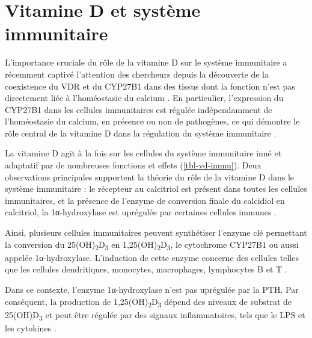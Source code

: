 \documentclass[
  a4paper,
  DIV=11,
  numbers=noendperiod,
  listof=totoc]{scrreprt}
\begin{document}
\newpage{}

\hypertarget{vitamine-d-et-systuxe8me-immunitaire}{%
\chapter{Vitamine D et système
immunitaire}\label{vitamine-d-et-systuxe8me-immunitaire}}

L'importance cruciale du rôle de la vitamine D sur le système
immunitaire a récemment captivé l'attention des chercheurs depuis la
découverte de la coexistence du \ac{VDR} et du \ac{CYP27B1} dans des
tissus dont la fonction n'est pas directement liée à l'homéostasie du
calcium \autocite{Zehnder.2001}. En particulier, l'expression du
\ac{CYP27B1} dans les cellules immunitaires est régulée indépendamment
de l'homéostasie du calcium, en présence ou non de pathogènes, ce qui
démontre le rôle central de la vitamine D dans la régulation du système
immunitaire \autocite{White.2022}.

La vitamine D agit à la fois sur les cellules du système immunitaire
inné et adaptatif par de nombreuses fonctions et effets
(\cref{tbl-vd-immu}). Deux observations principales supportent la
théorie du rôle de la vitamine D dans le système immunitaire : le
récepteur au calcitriol est présent dans toutes les cellules
immunitaires, et la présence de l'enzyme de conversion finale du
calcidiol en calcitriol, la 1α-hydroxylase est uprégulée par certaines
cellules immunes \autocite{Giannini.2022}.

Ainsi, plusieurs cellules immunitaires peuvent synthétiser l'enzyme clé
permettant la conversion du 25(OH)\textsubscript{2}D\textsubscript{3} en
1,25(OH)\textsubscript{2}D\textsubscript{3}, le cytochrome CYP27B1 ou
aussi appelée 1α-hydroxylase. L'induction de cette enzyme concerne des
cellules telles que les cellules dendritiques, monocytes, macrophages,
lymphocytes B et T \autocites[ ]{Giannini.2022}{Dankers.2017}.

Dans ce contexte, l'enzyme 1α-hydroxylase n'est pas uprégulée par la
\ac{PTH}. Par conséquent, la production de
1,25(OH)\textsubscript{2}D\textsubscript{3} dépend des niveaux de
substrat de 25(OH)D\textsubscript{3} et peut être régulée par des
signaux inflammatoires, tels que le \ac{LPS} et les cytokines
\autocite{Giannini.2022}.
\end{document}
